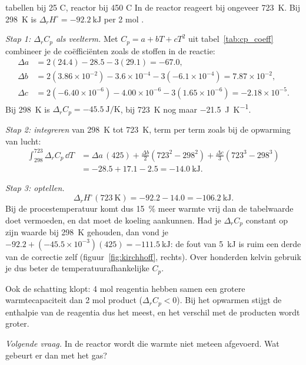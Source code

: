 \begin{casusuitgewerkt}{tabellen bij 25 \textdegree{}C, reactor bij 450 \textdegree{}C}
In de reactor reageert  bij ongeveer \SI{723}{\kelvin}. Bij \SI{298}{\kelvin} is $\Delta_r H^\circ = \SI{-92.2}{\kilo\joule}$ per 2 mol .

\emph{Stap 1: $\Delta_r C_p$ als veelterm.} Met $C_p = a + bT + cT^2$ uit tabel~\ref{tab:cp_coeff} combineer je de co\"effici\"enten zoals de stoffen in de reactie:
\begin{align*}
\Delta a &= 2(24.4) - 28.5 - 3(29.1) = -67.0,\\
\Delta b &= 2(3.86\times10^{-2}) - 3.6\times10^{-4} - 3(-6.1\times10^{-4}) = 7.87\times10^{-2},\\
\Delta c &= 2(-6.40\times10^{-6}) - 4.00\times10^{-6} - 3(1.65\times10^{-6}) = -2.18\times10^{-5}.
\end{align*}
Bij \SI{298}{\kelvin} is $\Delta_r C_p = \SI{-45.5}{\joule\per\kelvin}$, bij \SI{723}{\kelvin} nog maar \SI{-21.5}{\joule\per\kelvin}.

\emph{Stap 2: integreren} van \SI{298}{\kelvin} tot \SI{723}{\kelvin}, term per term zoals bij de opwarming van lucht:
\begin{align*}
\int_{298}^{723} \Delta_r C_p\,\dd T &= \Delta a\,(425) + \frac{\Delta b}{2}(723^2 - 298^2) + \frac{\Delta c}{3}(723^3 - 298^3)\\
&= -28.5 + 17.1 - 2.5 = \SI{-14.0}{\kilo\joule}.
\end{align*}

\emph{Stap 3: optellen.}
\[
\Delta_r H^\circ(\SI{723}{\kelvin}) = -92.2 - 14.0 = \SI{-106.2}{\kilo\joule}.
\]
Bij de procestemperatuur komt dus \SI{15}{\percent} meer warmte vrij dan de tabelwaarde doet vermoeden, en dat moet de koeling aankunnen. Had je $\Delta_r C_p$ constant op zijn waarde bij \SI{298}{\kelvin} gehouden, dan vond je $-92.2 + (-45.5\times10^{-3})(425) = \SI{-111.5}{\kilo\joule}$: de fout van \SI{5}{\kilo\joule} is ruim een derde van de correctie zelf (figuur~\ref{fig:kirchhoff}, rechts). Over honderden kelvin gebruik je dus beter de temperatuurafhankelijke $C_p$.

Ook de schatting klopt: 4 mol reagentia hebben samen een grotere warmtecapaciteit dan 2 mol product ($\Delta_r C_p < 0$). Bij het opwarmen stijgt de enthalpie van de reagentia dus het meest, en het verschil met de producten wordt groter.

\emph{Volgende vraag.} In de reactor wordt die warmte niet meteen afgevoerd. Wat gebeurt er dan met het gas?
\end{casusuitgewerkt}


